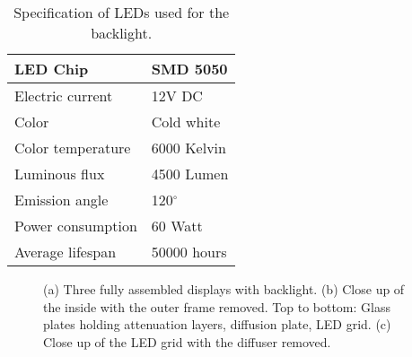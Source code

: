 \begin{table}[htb]
	\centering
	\begin{tabular}{| l | l |}
		\hline
		LED Chip					& SMD 5050 \\
		\hline
		Electric current			& 12V DC \\
		\hline
		Color 						& Cold white \\
		\hline 
		Color temperature 			& 6000 Kelvin \\ 
		\hline  
		Luminous flux 				& 4500 Lumen \\ 
		\hline
		Emission angle				& 120$^\circ$ \\
		\hline 
		Power consumption			& 60 Watt \\
		\hline
		Average lifespan			& 50000 hours \\
		\hline
	\end{tabular} 
	\caption[LED specification]
	{Specification of LEDs used for the backlight.}
	\label{tbl:LED_specs}
\end{table}

\begin{figure}[tb]
	\hfill
	\hfill
	\caption[Handcrafted backlights for the attenuation displays]
			{(a) Three fully assembled displays with backlight.
			 (b) Close up of the inside with the outer frame removed.
				 Top to bottom: Glass plates holding attenuation layers, diffusion plate, LED grid.
			 (c) Close up of the LED grid with the diffuser removed.}
\end{figure}
